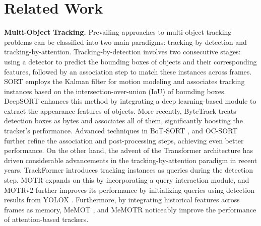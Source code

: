 \section{Related Work}
{\bfseries Multi-Object Tracking.}
Prevailing approaches to multi-object tracking problems can be classified into two main paradigms: tracking-by-detection and tracking-by-attention. Tracking-by-detection involves two consecutive stages: using a detector to predict the bounding boxes of objects and their corresponding features, followed by an association step to match these instances across frames. SORT \cite{wojke2017simple} employs the Kalman filter for motion modeling and associates tracking instances based on the intersection-over-union (IoU) of bounding boxes. DeepSORT \cite{Wojke2018deepsort} enhances this method by integrating a deep learning-based module to extract the appearance features of objects. More recently, ByteTrack \cite{zhang2022bytetrack} treats detection boxes as bytes and associates all of them, significantly boosting the tracker's performance. Advanced techniques in BoT-SORT \cite{aharon2022botsort}, and OC-SORT \cite{cao2023observation} further refine the association and post-processing steps, achieving even better performance. On the other hand, the advent of the Transformer architecture \cite{vaswani2017attention} has driven considerable advancements in the tracking-by-attention paradigm in recent years. TrackFormer \cite{meinhardt2021trackformer} introduces tracking instances as queries during the detection step. MOTR \cite{zeng2021motr} expands on this by incorporating a query interaction module, and MOTRv2 \cite{zhang2023motrv2} further improves its performance by initializing queries using detection results from YOLOX \cite{yolox2021}. Furthermore, by integrating historical features across frames as memory, MeMOT \cite{cai2022memot}, and MeMOTR \cite{MeMOTR} noticeably improve the performance of attention-based trackers.

